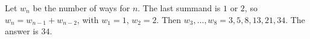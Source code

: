 Let $w_n$ be the number of ways for $n$. The last summand is $1$ or $2$, so $w_n=w_{n-1}+w_{n-2}$, with $w_1=1$, $w_2=2$. Then $w_3,\dots,w_8=3,5,8,13,21,34$. The answer is $\boxed{34}$.
